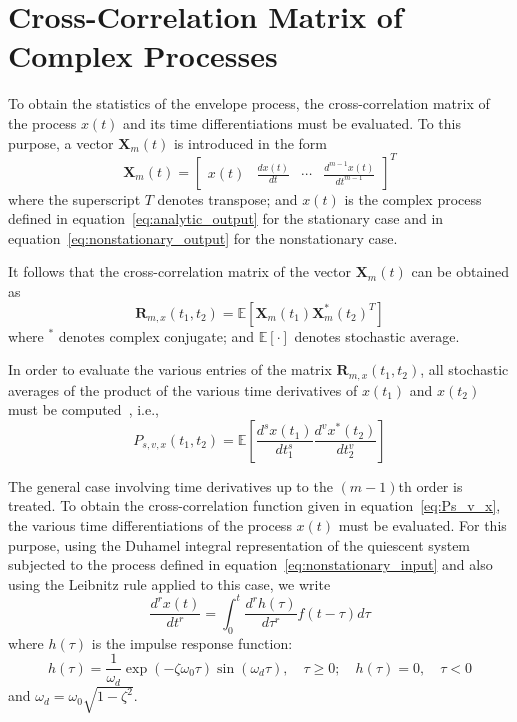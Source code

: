 \documentclass[12pt]{article}
\begin{document}
\section{Cross-Correlation Matrix of Complex Processes}
To obtain the statistics of the envelope process, the cross-correlation matrix of the process $x(t)$ and its time differentiations must be evaluated. To this purpose, a vector $\mathbf{X}_m(t)$ is introduced in the form
\begin{equation}
    \mathbf{X}_m(t) = \begin{bmatrix} x(t) & \frac{d x(t)}{dt} & \cdots & \frac{d^{m-1} x(t)}{dt^{m-1}} \end{bmatrix}^T
    \label{eq:Xm_def}
\end{equation}
where the superscript $T$ denotes transpose; and $x(t)$ is the complex process defined in equation~\eqref{eq:analytic_output} for the stationary case and in equation~\eqref{eq:nonstationary_output} for the nonstationary case.

It follows that the cross-correlation matrix of the vector $\mathbf{X}_m(t)$ can be obtained as
\begin{equation}
    \mathbf{R}_{m,x}(t_1, t_2) = \mathbb{E} \left[ \mathbf{X}_m(t_1) \mathbf{X}_m^*(t_2)^T \right]
    \label{eq:cross_corr_matrix}
\end{equation}
where $^*$ denotes complex conjugate; and $\mathbb{E}[\cdot]$ denotes stochastic average.

In order to evaluate the various entries of the matrix $\mathbf{R}_{m,x}(t_1, t_2)$, all stochastic averages of the product of the various time derivatives of $x(t_1)$ and $x(t_2)$ must be computed~\cite{borino1988, dipaola1985, dipaola_muscolino1985}, i.e.,
\begin{equation}
    P_{s,v,x}(t_1, t_2) = \mathbb{E} \left[ \frac{d^s x(t_1)}{dt_1^s} \frac{d^v x^*(t_2)}{dt_2^v} \right]
    \label{eq:Ps_v_x}
\end{equation}

The general case involving time derivatives up to the $(m-1)$th order is treated. To obtain the cross-correlation function given in equation~\eqref{eq:Ps_v_x}, the various time differentiations of the process $x(t)$ must be evaluated. For this purpose, using the Duhamel integral representation of the quiescent system subjected to the process defined in equation~\eqref{eq:nonstationary_input} and also using the Leibnitz rule applied to this case, we write
\begin{equation}
    \frac{d^r x(t)}{dt^r} = \int_0^t \frac{d^r h(\tau)}{d\tau^r} f(t - \tau) d\tau
    \label{eq:drx_dt}
\end{equation}
where $h(\tau)$ is the impulse response function:
\begin{equation}
    h(\tau) = \frac{1}{\omega_d} \exp(-\zeta \omega_0 \tau) \sin(\omega_d \tau), \quad \tau \geq 0; \quad h(\tau) = 0, \quad \tau < 0
    \label{eq:impulse_response}
\end{equation}
and $\omega_d = \omega_0 \sqrt{1 - \zeta^2}$.
\end{document}
